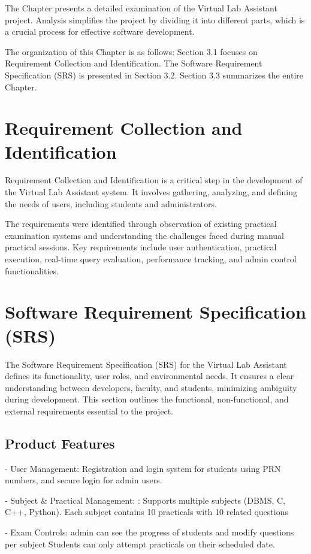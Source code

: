 \justifying 
The Chapter presents a detailed examination of the Virtual Lab Assistant project.
Analysis simplifies the project by dividing it into different parts, which is a crucial process for effective software development.
\item The organization of this Chapter is as follows:
Section 3.1 focuses on Requirement Collection and Identification.
The Software Requirement Specification (SRS) is presented in Section 3.2.
Section 3.3 summarizes the entire Chapter.


\section{Requirement Collection and Identification}
Requirement Collection and Identification is a critical step in the development of the Virtual Lab Assistant system. It involves gathering, analyzing, and defining the needs of users, including students and administrators.

The requirements were identified through observation of existing practical examination systems and understanding the challenges faced during manual practical sessions. Key requirements include user authentication, practical execution, real-time query evaluation, performance tracking, and admin control functionalities.


\section{Software Requirement Specification (SRS)}
The Software Requirement Specification (SRS) for the Virtual Lab Assistant defines its functionality, user roles, and environmental needs. It ensures a clear understanding between developers, faculty, and students, minimizing ambiguity during development.
This section outlines the functional, non-functional, and external requirements essential to the project.
\subsection{Product Features}
- User Management: Registration and login system for students using PRN numbers, and secure login for admin users.  

\item- Subject & Practical Management:
: Supports multiple subjects (DBMS, C, C++, Python). Each subject contains 10 practicals with 10 related questions 
\item - Exam Controls: admin can see the progress of students and modify questions per subject  Students can only attempt practicals on their scheduled date.

